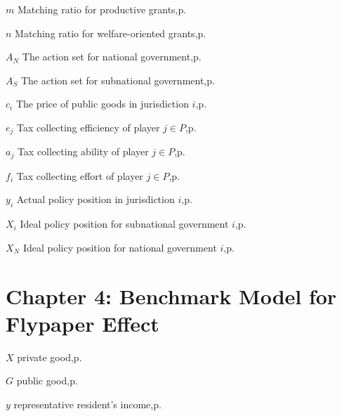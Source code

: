 \begin{eqlist}
    \item[$m$]
    Matching ratio for productive grants,\hfill p.~\pageref{generalandcategorical}

    \item[$n$]
    Matching ratio for welfare-oriented grants,\hfill p.~\pageref{generalandcategorical}

    \item[$A_N$]
    The action set for national government,\hfill p.~\pageref{action}

    \item[$A_S$]
    The action set for subnational government,\hfill p.~\pageref{action}

    \item[$c_i$]
    The price of public goods in jurisdiction $i$,\hfill p.~\pageref{priceandeffort}

    \item[$e_j$]
    Tax collecting efficiency of player $j \in P$,\hfill p.~\pageref{priceandeffort}

    \item[$a_j$]
    Tax collecting ability of player $j \in P$,\hfill p.~\pageref{priceandeffort}

    \item[$f_i$]
    Tax collecting effort of player $j \in P$,\hfill p.~\pageref{priceandeffort}

    \item[$y_i$]
    Actual policy position in jurisdiction $i$,\hfill p.~\pageref{actposition}

    \item[$X_i$]
    Ideal policy position for subnational government $i$,\hfill p.~\pageref{actposition}

    \item[$X_N$]
    Ideal policy position for national government $i$,\hfill p.~\pageref{actposition}

    \section*{ Chapter 4: Benchmark Model for Flypaper Effect}

    \item[$X$]
    private good,\hfill p.~\pageref{G}

    \item[$G$]
    public good,\hfill p.~\pageref{X}

    \item[$y$]
    representative resident's income,\hfill p.~\pageref{y}


\end{eqlist}
